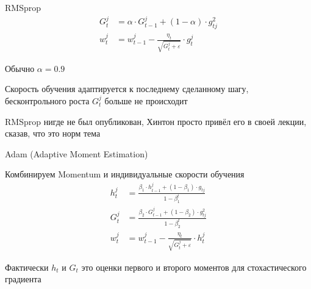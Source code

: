 \documentclass[notes,12pt, aspectratio=169]{beamer}
\newenvironment{wideitemize}{\itemize\addtolength{\itemsep}{10pt}}{\enditemize}
\begin{document}
\begin{frame}{RMSprop}
\begin{equation*}
\begin{aligned}
G_t^j &= \alpha \cdot G_{t-1}^j + (1 - \alpha) \cdot g_{tj}^2 \\
w_t^j &= w_{t-1}^j - \frac{\eta_t}{\sqrt{G_t^j + \varepsilon}} \cdot g_t^j
\end{aligned}	
\end{equation*}
\begin{wideitemize}
\item Обычно $ \alpha = 0.9$
\item Скорость обучения адаптируется к последнему сделанному шагу, бесконтрольного роста $G_t^j$ больше не происходит 
\item RMSprop нигде не был опубликован, Хинтон просто привёл его в своей лекции, сказав, что это норм тема
\end{wideitemize}
\end{frame}


\begin{frame}{Adam (Adaptive Moment Estimation)}
\begin{wideitemize} 
	\item Комбинируем Momentum и индивидуальные скорости обучения
\end{wideitemize}
\begin{equation*}
\begin{aligned}
h_t^j &= \frac{\beta_1 \cdot h_{t-1}^j + (1 - \beta_1) \cdot g_{tj}}{1 - \beta_1^t} \\
G_t^j &= \frac{\beta_2 \cdot G_{t-1}^j + (1 - \beta_2) \cdot g_{tj}^2}{1 - \beta_2^t} \\
w_t^j &= w_{t-1}^j - \frac{\eta_t}{\sqrt{G_t^j + \varepsilon}} \cdot h_t^j
\end{aligned}	
\end{equation*}
\begin{wideitemize} 
\item Фактически $h_t$ и $G_t$ это оценки первого и второго моментов для стохастического градиента
\end{wideitemize}

\end{frame}
\end{document}

